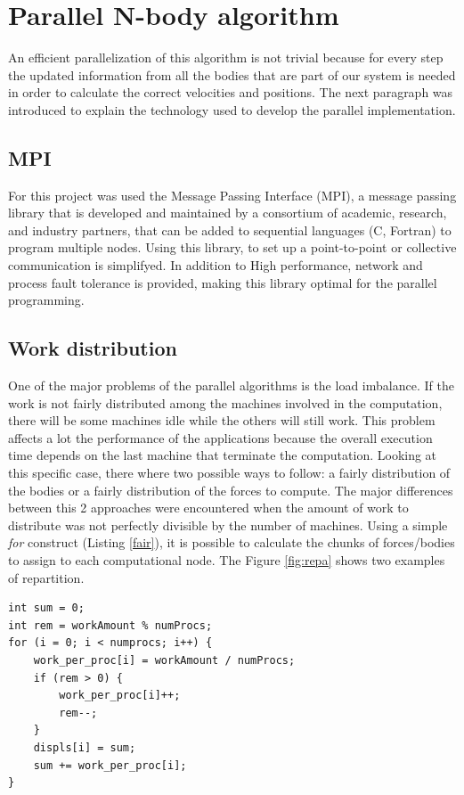 \documentclass[a4paper]{article}
\begin{document}
\section{Parallel N-body algorithm}
\label{sec:par}
An efficient parallelization of this algorithm is not trivial because for every step the updated information from all the bodies that are part of our system is needed in order to calculate the correct velocities and positions. The next paragraph was introduced to explain the technology used to develop the parallel implementation.

\subsection{MPI}
\label{sec:mpi}
For this project was used the Message Passing Interface (MPI), a message passing library that is developed and maintained by a consortium of academic, research, and industry partners, that can be added to sequential languages (C, Fortran) to program multiple nodes. Using this library, to set up a point-to-point or collective communication is simplifyed. In addition to High performance, network and process fault tolerance is provided, making this library optimal for the parallel programming.

\subsection{Work distribution}
\label{sec:bodies_distr}
One of the major problems of the parallel algorithms is the load imbalance. If the work is not fairly distributed among the machines involved in the computation, there will be some machines idle while the others will still work. This problem affects a lot the performance of the applications because the overall execution time depends on the last machine that terminate the computation. 
Looking at this specific case, there where two possible ways to follow: a fairly distribution of the bodies or a fairly distribution of the forces to compute. The major differences between this 2 approaches were encountered when the amount of work to distribute was not perfectly divisible by the number of machines.
Using a simple \textit{for} construct (Listing \ref{fair}), it is possible to calculate the chunks of forces/bodies to assign to each computational node. The Figure \ref{fig:repa} shows two examples of repartition.

\begin{lstlisting}[label=fair, caption=fair distribution of work]
int sum = 0;
int rem = workAmount % numProcs; 
for (i = 0; i < numprocs; i++) {
    work_per_proc[i] = workAmount / numProcs;
    if (rem > 0) {
        work_per_proc[i]++;
        rem--;
    }
    displs[i] = sum;
    sum += work_per_proc[i];
}
\end{lstlisting}
\FloatBarrier
\end{document}
